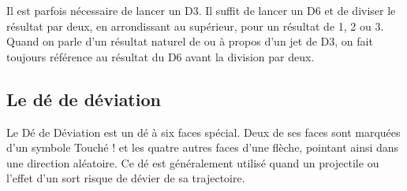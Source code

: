 Il est parfois nécessaire de lancer un D3. Il suffit de lancer un D6 et de diviser le résultat par deux, en arrondissant au supérieur, pour un résultat de 1, 2 ou 3. Quand on parle d'un résultat naturel de  ou  à propos d'un jet de D3, on fait toujours référence au résultat du D6 avant la division par deux.

\subsection{Le dé de déviation}

Le Dé de Déviation est un dé à six faces spécial. Deux de ses faces sont marquées d'un symbole \og Touché ! \fg{} et les quatre autres faces d'une flèche, pointant ainsi dans une direction aléatoire. Ce dé est généralement utilisé quand un projectile ou l'effet d'un sort risque de dévier de sa trajectoire.

